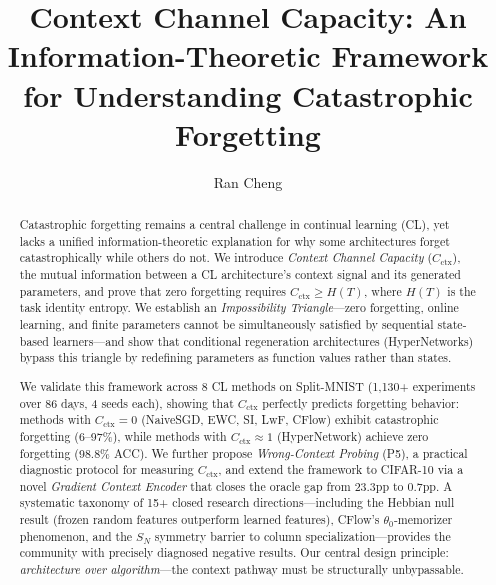 \documentclass{article}
\title{Context Channel Capacity: An Information-Theoretic Framework\\for Understanding Catastrophic Forgetting}
\author{
  Ran Cheng
}
\begin{document}
\maketitle

\begin{abstract}
Catastrophic forgetting remains a central challenge in continual learning (CL), yet lacks a unified information-theoretic explanation for why some architectures forget catastrophically while others do not. We introduce \emph{Context Channel Capacity} ($C_\mathrm{ctx}$), the mutual information between a CL architecture's context signal and its generated parameters, and prove that zero forgetting requires $C_\mathrm{ctx} \geq H(T)$, where $H(T)$ is the task identity entropy. We establish an \emph{Impossibility Triangle}---zero forgetting, online learning, and finite parameters cannot be simultaneously satisfied by sequential state-based learners---and show that conditional regeneration architectures (HyperNetworks) bypass this triangle by redefining parameters as function values rather than states.

We validate this framework across 8 CL methods on Split-MNIST (1,130+ experiments over 86 days, 4 seeds each), showing that $C_\mathrm{ctx}$ perfectly predicts forgetting behavior: methods with $C_\mathrm{ctx} = 0$ (NaiveSGD, EWC, SI, LwF, CFlow) exhibit catastrophic forgetting (6--97\%), while methods with $C_\mathrm{ctx} \approx 1$ (HyperNetwork) achieve zero forgetting (98.8\% ACC). We further propose \emph{Wrong-Context Probing} (P5), a practical diagnostic protocol for measuring $C_\mathrm{ctx}$, and extend the framework to CIFAR-10 via a novel \emph{Gradient Context Encoder} that closes the oracle gap from 23.3pp to 0.7pp. A systematic taxonomy of 15+ closed research directions---including the Hebbian null result (frozen random features outperform learned features), CFlow's $\theta_0$-memorizer phenomenon, and the $S_N$ symmetry barrier to column specialization---provides the community with precisely diagnosed negative results. Our central design principle: \emph{architecture over algorithm}---the context pathway must be structurally unbypassable.
\end{abstract}

\end{document}
